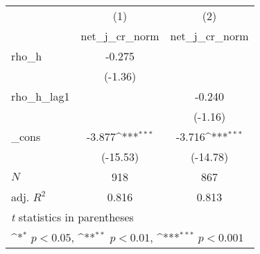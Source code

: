 {
\def\sym#1{\ifmmode^{#1}\else\(^{#1}\)\fi}
\begin{tabular}{l*{2}{c}}
\toprule
            &\multicolumn{1}{c}{(1)}&\multicolumn{1}{c}{(2)}\\
            &\multicolumn{1}{c}{net\_j\_cr\_norm}&\multicolumn{1}{c}{net\_j\_cr\_norm}\\
\midrule
rho\_h       &      -0.275         &                     \\
            &     (-1.36)         &                     \\
\addlinespace
rho\_h\_lag1  &                     &      -0.240         \\
            &                     &     (-1.16)         \\
\addlinespace
\_cons      &      -3.877\sym{***}&      -3.716\sym{***}\\
            &    (-15.53)         &    (-14.78)         \\
\midrule
\(N\)       &         918         &         867         \\
adj. \(R^{2}\)&       0.816         &       0.813         \\
\bottomrule
\multicolumn{3}{l}{\footnotesize \textit{t} statistics in parentheses}\\
\multicolumn{3}{l}{\footnotesize \sym{*} \(p<0.05\), \sym{**} \(p<0.01\), \sym{***} \(p<0.001\)}\\
\end{tabular}
}
